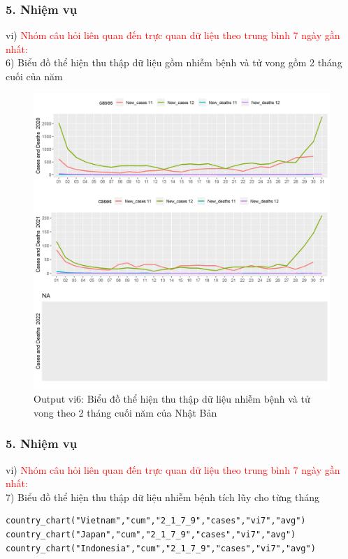 \documentclass[english,10pt,table]{beamer}
\begin{document}
\begin{frame}[fragile]
\frametitle{5.  Nhiệm vụ}
vi) \textcolor{red}{Nhóm câu hỏi liên quan đến trực quan dữ liệu theo trung bình 7 ngày gần nhất:}\\
    6) Biểu đồ thể hiện thu thập dữ liệu gồm nhiễm bệnh và tử vong gồm 2 tháng cuối của năm
	\begin{figure}[h!]
	\begin{center}
		    \includegraphics[scale = 0.26]{Images/VI/vi6 Japan .jpeg}
		     \caption{Output vi6: Biểu đồ thể hiện thu thập dữ liệu nhiễm bệnh và tử vong theo 2 tháng cuối năm của Nhật Bản}
		\end{center}
		\end{figure}
\end{frame}

\begin{frame}[fragile]
\frametitle{5.  Nhiệm vụ}
vi) \textcolor{red}{Nhóm câu hỏi liên quan đến trực quan dữ liệu theo trung bình 7 ngày gần nhất:}\\
    7) Biểu đồ thể hiện thu thập dữ liệu nhiễm bệnh tích lũy cho từng tháng
\begin{lstlisting}[frame = single,basicstyle=\tiny]
country_chart("Vietnam","cum","2_1_7_9","cases","vi7","avg")
country_chart("Japan","cum","2_1_7_9","cases","vi7","avg")
country_chart("Indonesia","cum","2_1_7_9","cases","vi7","avg")
		\end{lstlisting}
\end{frame}
\end{document}
